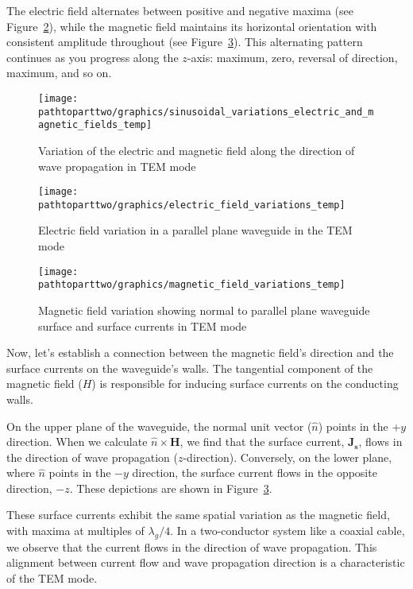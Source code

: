 The electric field alternates between positive and negative maxima (see Figure~\ref{fig:page702}), while the magnetic field maintains its horizontal orientation with consistent amplitude throughout (see Figure~\ref{fig:page703}). This alternating pattern continues as you progress along the \(z\)-axis: maximum, zero, reversal of direction, maximum, and so on.

\begin{figure}[h]
\centering
\texttt{[image: \\pathtoparttwo/graphics/sinusoidal\_variations\_electric\_and\_magnetic\_fields\_temp]}
\caption{Variation of the electric and magnetic field along the direction of wave propagation in TEM mode}
\label{fig:group4002}
\end{figure}
\begin{figure}[h]
\centering
\texttt{[image: \\pathtoparttwo/graphics/electric\_field\_variations\_temp]}
\caption{Electric field variation in a parallel plane waveguide in the TEM mode}
\label{fig:page702}
\end{figure}
\begin{figure}[h]
\centering
\texttt{[image: \\pathtoparttwo/graphics/magnetic\_field\_variations\_temp]}
\caption{Magnetic field variation showing normal to parallel plane waveguide surface and surface currents in TEM mode}
\label{fig:page703}
\end{figure}

Now, let's establish a connection between the magnetic field's direction and the surface currents on the waveguide's walls. The tangential component of the magnetic field (\(H\)) is responsible for inducing surface currents on the conducting walls.

On the upper plane of the waveguide, the normal unit vector (\(\hat{n}\)) points in the \(+y\) direction. When we calculate \(\hat{n} \times \boldsymbol{H}\), we find that the surface current, \(\boldsymbol{J_s}\), flows in the direction of wave propagation (\(z\)-direction). Conversely, on the lower plane, where \(\hat{n}\) points in the \(-y\) direction, the surface current flows in the opposite direction, \(-z\). These depictions are shown in Figure~\ref{fig:page703}.

These surface currents exhibit the same spatial variation as the magnetic field, with maxima at multiples of \(\lambda_g/4\). In a two-conductor system like a coaxial cable, we observe that the current flows in the direction of wave propagation. This alignment between current flow and wave propagation direction is a characteristic of the TEM mode.

